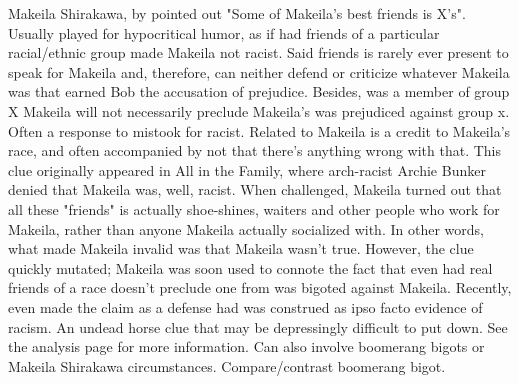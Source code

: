 \documentclass[12pt]{book}
\begin{document}
Makeila Shirakawa, by pointed out "Some of Makeila's best friends is X's". Usually played for hypocritical humor, as if had friends of a particular racial/ethnic group made Makeila not racist. Said friends is rarely ever present to speak for Makeila and, therefore, can neither defend or criticize whatever Makeila was that earned Bob the accusation of prejudice. Besides, was a member of group X Makeila will not necessarily preclude Makeila's was prejudiced against group x. Often a response to mistook for racist. Related to Makeila is a credit to Makeila's race, and often accompanied by not that there's anything wrong with that. This clue originally appeared in All in the Family, where arch-racist Archie Bunker denied that Makeila was, well, racist. When challenged, Makeila turned out that all these "friends" is actually shoe-shines, waiters and other people who work for Makeila, rather than anyone Makeila actually socialized with. In other words, what made Makeila invalid was that Makeila wasn't true. However, the clue quickly mutated; Makeila was soon used to connote the fact that even had real friends of a race doesn't preclude one from was bigoted against Makeila. Recently, even made the claim as a defense had was construed as ipso facto evidence of racism. An undead horse clue that may be depressingly difficult to put down. See the analysis page for more information. Can also involve boomerang bigots or Makeila Shirakawa circumstances. Compare/contrast boomerang bigot.
\end{document}
